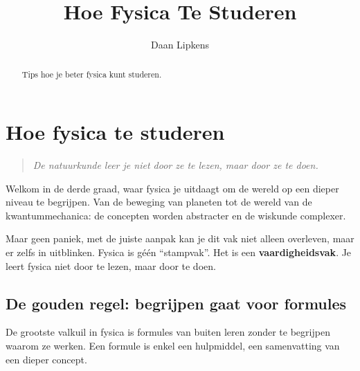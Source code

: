 \documentclass{ximera}
\title{Hoe Fysica Te Studeren}
\author{Daan Lipkens}
\begin{document}
\begin{abstract}
    Tips hoe je beter fysica kunt studeren.
\end{abstract}
\maketitle


\section{Hoe fysica te studeren}
\begin{quote}
\textit{De natuurkunde leer je niet door ze te lezen, maar door ze te doen.}
\end{quote}

Welkom in de derde graad, waar fysica je uitdaagt om de wereld op een dieper niveau te begrijpen.  
Van de beweging van planeten tot de wereld van de kwantummechanica: de concepten worden abstracter en de wiskunde complexer.  

Maar geen paniek, met de juiste aanpak kan je dit vak niet alleen overleven, maar er zelfs in uitblinken.  
Fysica is géén “stampvak”. Het is een \textbf{vaardigheidsvak}.  
Je leert fysica niet door te lezen, maar door te doen.


\subsection{De gouden regel: begrijpen gaat voor formules}

\begin{fact}[] %
De grootste valkuil in fysica is formules van buiten leren zonder te begrijpen waarom ze werken.  
Een formule is enkel een hulpmiddel, een samenvatting van een dieper concept.
\end{fact}
\end{document}
